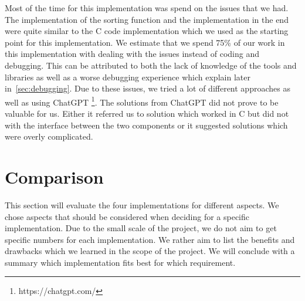 \documentclass[conference]{IEEEtran}
\begin{document}
Most of the time for this implementation was spend on the issues that we had. The implementation of the sorting function and the implementation in the end were quite similar to the C code implementation which we used as the starting point for this implementation. We estimate that we spend 75\% of our work in this implementation with dealing with the issues instead of coding and debugging. This can be attributed to both the lack of knowledge of the tools and libraries as well as a worse debugging experience which explain later in~\ref{sec:debugging}. Due to these issues, we tried a lot of different approaches as well as using ChatGPT \footnote{https://chatgpt.com/}. The solutions from ChatGPT did not prove to be valuable for us. Either it referred us to solution which worked in C but did not with the interface between the two components or it suggested solutions which were overly complicated.

\section{Comparison}
This section will evaluate the four implementations for different aspects. We chose aspects that should be considered when deciding for a specific implementation. Due to the small scale of the project, we do not aim to get specific numbers for each implementation. We rather aim to list the benefits and drawbacks which we learned in the scope of the project. We will conclude with a summary which implementation fits best for which requirement.
\end{document}
